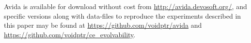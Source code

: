 \documentclass[PhD]{msu-thesis}
\begin{document}
Avida is available for download without cost from \url{http://avida.devosoft.org/}, and specific versions along with data-files to reproduce the experiments described in this paper may be found at \url{https://github.com/voidptr/avida} and \url{https://github.com/voidptr/ce_evolvability}.
 


\end{document}
